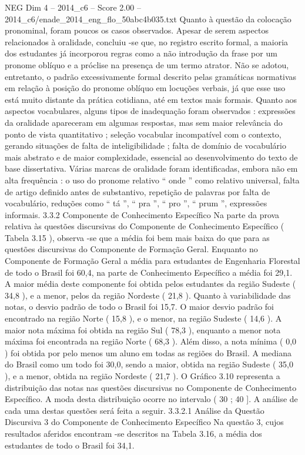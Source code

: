 \begin{textsample}{NEG Dim 4 – 2014\_c6 – Score 2.00 – 2014\_c6/enade\_2014\_eng\_flo\_50abc4b035.txt}
Quanto à questão da colocação pronominal, foram poucos os casos observados.
Apesar de serem aspectos relacionados à oralidade, concluiu -se que, no registro escrito formal, a maioria dos estudantes já incorporou regras como a não introdução da frase por um pronome oblíquo e a próclise na presença de um termo atrator.
Não se adotou, entretanto, o padrão excessivamente formal descrito pelas gramáticas normativas em relação à posição do pronome oblíquo em locuções verbais, já que esse uso está muito distante da prática cotidiana, até em textos mais formais.
Quanto aos aspectos vocabulares, alguns tipos de inadequação foram observados : expressões da oralidade apareceram em algumas respostas, mas sem maior relevância do ponto de vista quantitativo ; seleção vocabular incompatível com o contexto, gerando situações de falta de inteligibilidade ; falta de domínio de vocabulário mais abstrato e de maior complexidade, essencial ao desenvolvimento do texto de base dissertativa.
Várias marcas de oralidade foram identificadas, embora não em alta frequência : o uso do pronome relativo “ onde ” como relativo universal, falta de artigo definido antes de substantivo, repetição de palavras por falta de vocabulário, reduções como “ tá ”, “ pra ”, “ pro ”, “ prum ”, expressões informais. 3.3.2 Componente de Conhecimento Específico Na parte da prova relativa às questões discursivas do Componente de Conhecimento Específico ( Tabela 3.15 ), observa -se que a média foi bem mais baixa do que para as questões discursivas do Componente de Formação Geral.
Enquanto no Componente de Formação Geral a média para estudantes de Engenharia Florestal de todo o Brasil foi 60,4, na parte de Conhecimento Específico a média foi 29,1.
A maior média deste componente foi obtida pelos estudantes da região Sudeste ( 34,8 ), e a menor, pelos da região Nordeste ( 21,8 ).
Quanto à variabilidade das notas, o desvio padrão de todo o Brasil foi 15,7.
O maior desvio padrão foi encontrado na região Norte ( 15,8 ), e o menor, na região Sudeste ( 14,6 ).
A maior nota máxima foi obtida na região Sul ( 78,3 ), enquanto a menor nota máxima foi encontrada na região Norte ( 68,3 ).
Além disso, a nota mínima ( 0,0 ) foi obtida por pelo menos um aluno em todas as regiões do Brasil.
A mediana do Brasil como um todo foi 30,0, sendo a maior, obtida na região Sudeste ( 35,0 ), e a menor, obtida na região Nordeste ( 21,7 ).
O Gráfico 3.10 representa a distribuição das notas nas questões discursivas no Componente de Conhecimento Específico.
A moda desta distribuição ocorre no intervalo ( 30 ; 40 ].
A análise de cada uma destas questões será feita a seguir. 3.3.2.1 Análise da Questão Discursiva 3 do Componente de Conhecimento Específico Na questão 3, cujos resultados aferidos encontram -se descritos na Tabela 3.16, a média dos estudantes de todo o Brasil foi 34,1.

\end{textsample}
